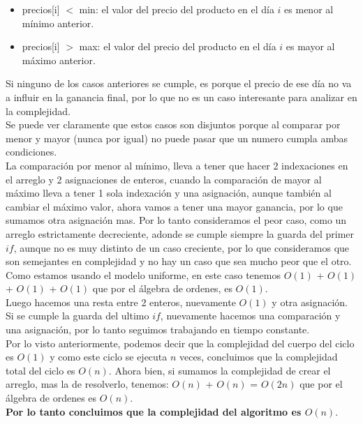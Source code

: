 \begin{itemize}
 \item precios[i] $<$ min: el valor del precio del producto en el día $i$ es
menor al mínimo anterior.
 \item precios[i] $>$ max: el valor del precio del producto en el día $i$ es
mayor al máximo anterior.
\end{itemize}

\indent Si ninguno de los casos anteriores se cumple, es porque el precio de ese
día no va a influir en la ganancia final, por lo que no es un caso interesante
para analizar en la complejidad.\\
\indent Se puede ver claramente que estos casos son disjuntos porque al comparar
por menor y mayor (nunca por igual) no puede pasar que un numero cumpla ambas
condiciones.\\
\indent La comparación por menor al mínimo, lleva a tener que hacer 2
indexaciones en el arreglo y 2 asignaciones de enteros, cuando la comparación de
mayor al máximo lleva a tener 1 sola indexación y una asignación, aunque también
al cambiar el máximo valor, ahora vamos a tener una mayor ganancia, por lo que
sumamos otra asignación mas. Por lo tanto
consideramos el peor caso, como un arreglo estrictamente decreciente, adonde se
cumple siempre la guarda del primer $if$, aunque no es muy distinto de un caso
creciente, por lo que consideramos que son semejantes en complejidad y no hay un
caso que sea mucho peor que el otro. Como estamos usando el modelo
uniforme, en este caso tenemos $O(1)$ + $O(1)$ + $O(1)$ + $O(1)$ que por el
álgebra de ordenes, es $O(1)$. \\                                               
\indent Luego hacemos una resta entre 2 enteros, nuevamente $O(1)$ y otra
asignación. Si se cumple la guarda del ultimo $if$, nuevamente hacemos una
comparación y una asignación, por lo tanto seguimos trabajando en tiempo
constante.\\
\indent Por lo visto anteriormente, podemos decir que la complejidad del cuerpo
del ciclo es $O(1)$ y como este ciclo se ejecuta $n$ veces, concluimos que la
complejidad total del ciclo es $O(n)$. Ahora bien, si sumamos la complejidad de
crear el arreglo, mas la de resolverlo, tenemos: $O(n)$ + $O(n)$ = $O(2n)$ que
por el álgebra de ordenes es $O(n)$.\\
\indent \textbf{Por lo tanto concluimos que la complejidad del algoritmo es
$O(n)$}.\\

\clearpage

